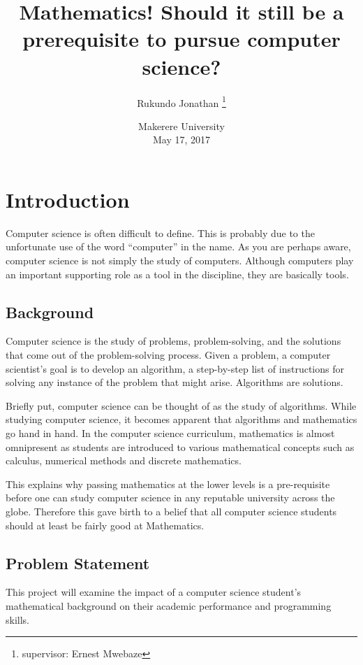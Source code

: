 \documentclass[options]{article}
\title{Mathematics! Should it still be a prerequisite to pursue computer science?}
\author{Rukundo Jonathan \thanks{supervisor: Ernest Mwebaze}}
\date{%
    Makerere University\\%
    May 17, 2017
}
\begin{document}
\begin{titlepage}
\maketitle
\end{titlepage}





\section{\textbf{ Introduction}} 
Computer science is often difficult to define. This is probably due to the unfortunate use of the word “computer” in the name. As you are perhaps aware, computer science is not simply the study of computers. Although computers play an important supporting role as a tool in the discipline, they are basically tools. 


\subsection{\textbf{Background}}
Computer science is the study of problems, problem-solving, and the solutions that come out of the problem-solving process. Given a problem, a computer scientist's goal is to develop an algorithm, a step-by-step list of instructions for solving any instance of the problem that might arise. Algorithms are solutions.\bigbreak

Briefly put, computer science can be thought of as the study of algorithms. While studying computer science, it becomes apparent that algorithms and mathematics go hand in hand. In the computer science curriculum, mathematics is almost omnipresent as students are introduced to various mathematical concepts such as calculus, numerical methods and discrete mathematics. \bigbreak

This explains why passing mathematics at the lower levels is a pre-requisite before one can study computer science in any reputable university across the globe. Therefore this gave birth to a belief that all computer science students should at least be fairly good at Mathematics. 


\subsection{\textbf{Problem Statement}}
This project will examine the impact of a computer science student's mathematical background on their academic performance and programming skills.
\end{document}
